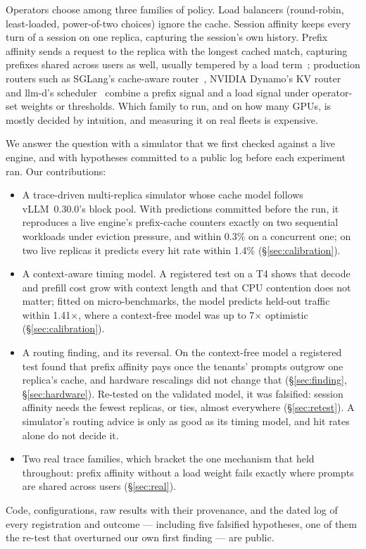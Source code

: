 \documentclass[10pt,twocolumn]{article}
\begin{document}
Operators choose among three families of policy. Load balancers (round-robin, least-loaded,
power-of-two choices) ignore the cache. Session affinity keeps every turn of a session on one
replica, capturing the session's own history. Prefix affinity sends a request to the replica with the
longest cached match, capturing prefixes shared across users as well, usually tempered by a load
term~\cite{srivatsa2024}; production routers such as SGLang's cache-aware router~\cite{sglang},
NVIDIA Dynamo's KV router~\cite{dynamo} and llm-d's scheduler~\cite{llmd} combine a prefix signal and
a load signal under operator-set weights or thresholds. Which family to run, and on how many GPUs, is
mostly decided by intuition, and measuring it on real fleets is expensive.

We answer the question with a simulator that we first checked against a live engine, and with
hypotheses committed to a public log before each experiment ran. Our contributions:
\begin{itemize}
\item A trace-driven multi-replica simulator whose cache model follows vLLM~0.30.0's block pool. With
  predictions committed before the run, it reproduces a live engine's prefix-cache counters exactly
  on two sequential workloads under eviction pressure, and within 0.3\% on a concurrent one; on two
  live replicas it predicts every hit rate within 1.4\% (\S\ref{sec:calibration}).
\item A context-aware timing model. A registered test on a T4 shows that decode and prefill cost grow
  with context length and that CPU contention does not matter; fitted on micro-benchmarks, the model
  predicts held-out traffic within 1.41$\times$, where a context-free model was up to 7$\times$
  optimistic (\S\ref{sec:calibration}).
\item A routing finding, and its reversal. On the context-free model a registered test found that
  prefix affinity pays once the tenants' prompts outgrow one replica's cache, and hardware
  rescalings did not change that (\S\ref{sec:finding}, \S\ref{sec:hardware}). Re-tested on the
  validated model, it was falsified: session affinity needs the fewest replicas, or ties, almost
  everywhere (\S\ref{sec:retest}). A simulator's routing advice is only as good as its timing model,
  and hit rates alone do not decide it.
\item Two real trace families, which bracket the one mechanism that held throughout: prefix affinity
  without a load weight fails exactly where prompts are shared across users (\S\ref{sec:real}).
\end{itemize}
Code, configurations, raw results with their provenance, and the dated log of every registration and
outcome --- including five falsified hypotheses, one of them the re-test that overturned our
own first finding --- are public.
\end{document}
